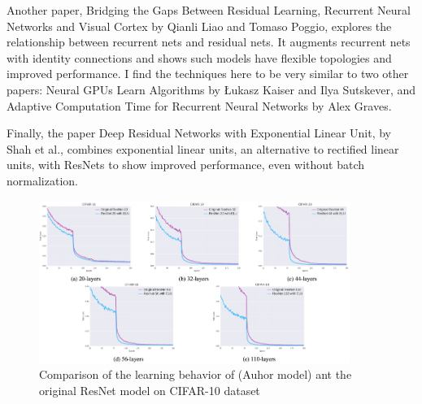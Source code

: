 \documentclass[12pt]{article}
\numberwithin{equation}{section}
\numberwithin{table}{section}
\numberwithin{figure}{section}
\begin{document}
Another paper, Bridging the Gaps Between Residual Learning, Recurrent Neural Networks and Visual Cortex by Qianli Liao and Tomaso Poggio, explores the relationship between recurrent nets and residual nets. It augments recurrent nets with identity connections and shows such models have flexible topologies and improved performance. I find the techniques here to be very similar to two other papers: Neural GPUs Learn Algorithms by Łukasz Kaiser and Ilya Sutskever, and Adaptive Computation Time for Recurrent Neural Networks by Alex Graves.

Finally, the paper Deep Residual Networks with Exponential Linear Unit, by Shah et al., combines exponential linear units, an alternative to rectified linear units, with ResNets to show improved performance, even without batch normalization.

\begin{figure} \centering
	\includegraphics[width=0.9\textwidth]{image4.png}
	\caption{Comparison of the learning behavior of (Auhor model) ant the original ResNet model on CIFAR-10 dataset}
	\label{figure4}
\end{figure}
\end{document}
